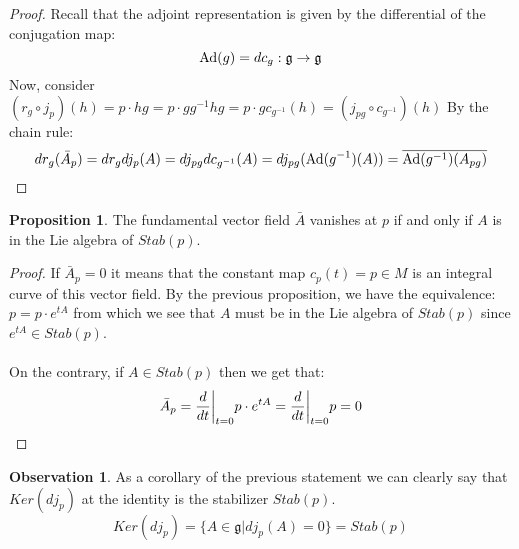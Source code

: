 \documentclass[12pt,a4paper]{report}
\theoremstyle{definition}
\theoremstyle{Theorem}
\newtheorem{Prop}[Def]{Proposition}
\theoremstyle{definition}
\theoremstyle{definition}
\newtheorem{Obs}[Def]{Observation}
\begin{document}
	\begin{proof}
		Recall that the adjoint representation is given by the differential of the conjugation map:
		$$\hbox{Ad}(g)=dc_g:\mathfrak{g}\rightarrow\mathfrak{g}$$
		Now, consider $(r_g\circ j_p)(h)=p\cdot hg=p\cdot gg^{-1}hg=p\cdot g c_{g^{-1}}(h)=(j_{pg}\circ c_{g^{-1}})(h)$
		By the chain rule:
		$$dr_g(\bar{A}_p)=dr_gdj_p(A)=dj_{pg}dc_{g^{-1}}(A)=dj_{pg}(\hbox{Ad}(g^{-1})(A))=\overline{\hbox{Ad}(g^{-1})(A_{pg})}$$
	\end{proof}
	\begin{Prop}
		The fundamental vector field $\bar{A}$ vanishes at $p$ if and only if $A$ is in the Lie algebra of $Stab(p)$.
	\end{Prop}
	\begin{proof}
		If $\bar{A}_p=0$ it means that the constant map $c_p(t)=p\in M$ is an integral curve of this vector field. By the previous proposition, we have the equivalence:
		$p=p\cdot e^{tA}$ from which we see that $A$ must be in the Lie algebra of $Stab(p)$ since $e^{tA}\in Stab(p)$.\\
		\\
		On the contrary, if $A\in Stab(p)$ then we get that:
		$$\bar{A}_p={d\over dt}\bigg|_{t=0}p\cdot e^{tA}=
		{d\over dt}\bigg|_{t=0}p=0$$
	\end{proof}
	\begin{Obs}\label{Kerdj}
		As a corollary of the previous statement we can clearly say that $Ker(dj_p)$ at the identity is the stabilizer $Stab(p)$.
		$$Ker (dj_p)=\{A\in \mathfrak{g}|dj_p(A)=0\}=Stab(p)$$
	\end{Obs}
\end{document}
